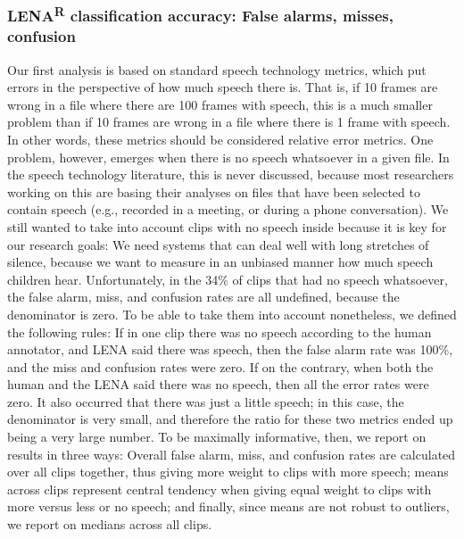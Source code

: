 \documentclass[english,table,man,floatsintext]{apa6}
\begin{document}
\hypertarget{lenar-classification-accuracy-false-alarms-misses-confusion}{%
\subsubsection{\texorpdfstring{LENA\textsuperscript{R} classification accuracy: False alarms, misses, confusion}{LENAR classification accuracy: False alarms, misses, confusion}}\label{lenar-classification-accuracy-false-alarms-misses-confusion}}

Our first analysis is based on standard speech technology metrics, which put errors in the perspective of how much speech there is. That is, if 10 frames are wrong in a file where there are 100 frames with speech, this is a much smaller problem than if 10 frames are wrong in a file where there is 1 frame with speech. In other words, these metrics should be considered relative error metrics. One problem, however, emerges when there is no speech whatsoever in a given file. In the speech technology literature, this is never discussed, because most researchers working on this are basing their analyses on files that have been selected to contain speech (e.g., recorded in a meeting, or during a phone conversation). We still wanted to take into account clips with no speech inside because it is key for our research goals: We need systems that can deal well with long stretches of silence, because we want to measure in an unbiased manner how much speech children hear. Unfortunately, in the 34\% of clips that had no speech whatsoever, the false alarm, miss, and confusion rates are all undefined, because the denominator is zero. To be able to take them into account nonetheless, we defined the following rules: If in one clip there was no speech according to the human annotator, and LENA said there was speech, then the false alarm rate was 100\%, and the miss and confusion rates were zero. If on the contrary, when both the human and the LENA said there was no speech, then all the error rates were zero. It also occurred that there was just a little speech; in this case, the denominator is very small, and therefore the ratio for these two metrics ended up being a very large number. To be maximally informative, then, we report on results in three ways: Overall false alarm, miss, and confusion rates are calculated over all clips together, thus giving more weight to clips with more speech; means across clips represent central tendency when giving equal weight to clips with more versus less or no speech; and finally, since means are not robust to outliers, we report on medians across all clips.
\end{document}
